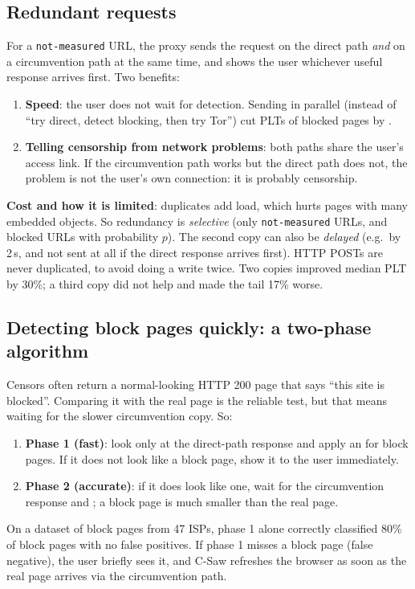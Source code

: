 \subsection{Redundant requests}
For a \texttt{not-measured} URL, the proxy sends the request on the direct path \emph{and} on a circumvention path at the same time, and shows the user
whichever useful response arrives first. Two benefits:
\begin{enumerate}
  \item \textbf{Speed}: the user does not wait for detection. Sending in parallel (instead of ``try direct, detect blocking, then try Tor'') cut PLTs of
        blocked pages by .
  \item \textbf{Telling censorship from network problems}: both paths share the user's access link. If the circumvention path works but the direct path
        does not, the problem is not the user's own connection: it is probably censorship.
\end{enumerate}
\textbf{Cost and how it is limited}: duplicates add load, which hurts pages with many embedded objects. So redundancy is \emph{selective}
(only \texttt{not-measured} URLs, and blocked URLs with probability $p$). The second copy can also be \emph{delayed} (e.g.\ by 2\,s, and not sent at
all if the direct response arrives first). HTTP POSTs are never duplicated, to avoid doing a write twice. Two copies improved median PLT by 30\%; a third
copy did not help and made the tail 17\% worse.

\subsection{Detecting block pages quickly: a two-phase algorithm}
Censors often return a normal-looking HTTP 200 page that says ``this site is blocked''. Comparing it with the real page is the reliable test, but that means
waiting for the slower circumvention copy. So:
\begin{enumerate}
  \item \textbf{Phase 1 (fast)}: look only at the direct-path response and apply an  for block pages. If it does not look like a
        block page, show it to the user immediately.
  \item \textbf{Phase 2 (accurate)}: if it does look like one, wait for the circumvention response and ; a block page is much smaller
        than the real page.
\end{enumerate}
On a dataset of block pages from 47 ISPs, phase 1 alone correctly classified 80\% of block pages with no false positives. If phase 1 misses a block page (false
negative), the user briefly sees it, and C-Saw refreshes the browser as soon as the real page arrives via the circumvention path.


